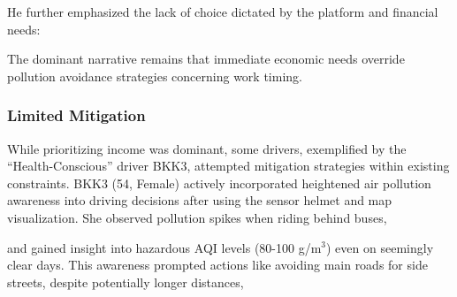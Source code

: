 \qpadding
{}
\qpadding

He further emphasized the lack of choice dictated by the platform and financial needs:

\qpadding
{}
\qpadding



The dominant narrative remains that immediate economic needs override pollution avoidance strategies concerning work timing.

\subsubsection{Limited Mitigation}
While prioritizing income was dominant, some drivers, exemplified by the ``Health-Conscious'' driver BKK3, attempted mitigation strategies within existing constraints.
BKK3 (54, Female) actively incorporated heightened air pollution awareness into driving decisions after using the sensor helmet and map visualization.
She observed pollution spikes when riding behind buses,

\qpadding
{}
\qpadding

and gained insight into hazardous AQI levels (80-100 \textmu{}g/m$^3$) even on seemingly clear days. This awareness prompted actions like avoiding main roads for side streets, despite potentially longer distances,

\qpadding
{}
\qpadding

